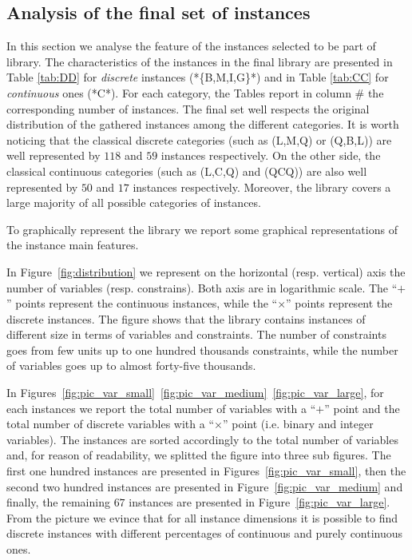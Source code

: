 \subsection{Analysis of the final set of instances}\label{subsec:final set}
In this section we analyse the feature of the instances selected to be
part of library.
The characteristics of the instances in the final library are
presented in Table \ref{tab:DD} for \emph{discrete} instances
(*\{B,M,I,G\}*) and in Table \ref{tab:CC} for
\emph{continuous} ones (*C*).
For each category, the Tables report in column $\#$ the corresponding
number of instances.
The final set well respects the original distribution of the gathered
instances among the different categories.
It is worth noticing that the classical discrete categories (such as
(L,M,Q) or (Q,B,L)) are well represented by $118$ and $59$  instances
respectively. On the other side, the classical continuous categories
(such as (L,C,Q) and (QCQ)) are also well represented by $50$ and $17$
 instances respectively.
Moreover, the library covers a large majority of all possible
categories of instances.

To graphically represent the library we report some
graphical representations of the instance main features.

In Figure~\ref{fig:distribution} we represent 
on the horizontal (resp. vertical) axis the number of variables (resp.
constrains). Both axis are in logarithmic scale.
The ``$+$'' points represent  the continuous instances, while the 
``$\times$'' points represent the discrete instances. The figure shows that
the library contains instances of different size in terms of variables
and constraints. The number of constraints goes from few units up to
one hundred thousands constraints, while the number of variables goes
up to almost forty-five thousands.

In Figures~\ref{fig:pic_var_small}~\ref{fig:pic_var_medium}~\ref{fig:pic_var_large},
for each instances we report the total number of variables with a
``$+$'' point and  the total number of discrete variables with a
``$\times$'' point (i.e. binary and integer variables). The instances are
sorted accordingly to the total number of variables and, for reason of
readability, we splitted the figure into three sub figures. The first one hundred
instances are presented in Figures~\ref{fig:pic_var_small},
then the second two hundred instances are presented in
Figure~\ref{fig:pic_var_medium} and finally, the remaining $67$
instances are presented in Figure~\ref{fig:pic_var_large}.
From the picture we evince that for all instance dimensions it is
possible to find discrete instances with different percentages of
continuous and purely continuous ones.



